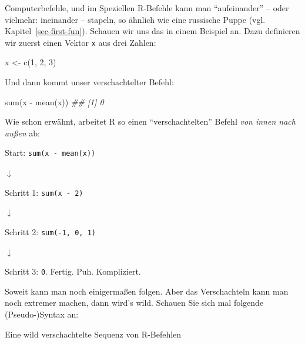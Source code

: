 \documentclass[
  a4paper,
]{scrbook}
\newenvironment{Shaded}{\begin{snugshade}}{\end{snugshade}}
\newcommand{\DecValTok}[1]{\textcolor[rgb]{0.68,0.00,0.00}{#1}}
\newcommand{\DocumentationTok}[1]{\textcolor[rgb]{0.37,0.37,0.37}{\textit{#1}}}
\newcommand{\FunctionTok}[1]{\textcolor[rgb]{0.28,0.35,0.67}{#1}}
\newcommand{\NormalTok}[1]{\textcolor[rgb]{0.00,0.23,0.31}{#1}}
\newcommand{\OtherTok}[1]{\textcolor[rgb]{0.00,0.23,0.31}{#1}}
\newcommand{\SpecialCharTok}[1]{\textcolor[rgb]{0.37,0.37,0.37}{#1}}
\theoremstyle{definition}
\theoremstyle{definition}
\theoremstyle{definition}
\theoremstyle{remark}
\begin{document}
Computerbefehle, und im Speziellen R-Befehle kann man ``aufeinander'' --
oder vielmehr: ineinander -- stapeln, so ähnlich wie eine russische
Puppe (vgl. Kapitel~\ref{sec-first-fun}). Schauen wir uns das in einem
Beispiel an. Dazu definieren wir zuerst einen Vektor \texttt{x} aus drei
Zahlen:

\begin{Shaded}
\begin{Highlighting}[]
\NormalTok{x }\OtherTok{\textless{}{-}} \FunctionTok{c}\NormalTok{(}\DecValTok{1}\NormalTok{, }\DecValTok{2}\NormalTok{, }\DecValTok{3}\NormalTok{)}
\end{Highlighting}
\end{Shaded}

Und dann kommt unser verschachtelter Befehl:

\begin{Shaded}
\begin{Highlighting}[]
\FunctionTok{sum}\NormalTok{(x }\SpecialCharTok{{-}} \FunctionTok{mean}\NormalTok{(x))}
\DocumentationTok{\#\# [1] 0}
\end{Highlighting}
\end{Shaded}

Wie schon erwähnt, arbeitet R so einen ``verschachtelten'' Befehl
\emph{von innen nach außen} ab:

Start: \texttt{sum(x\ -\ mean(x))}

{\(\downarrow\)}

Schritt 1: \texttt{sum(x\ -\ 2)}

{\(\downarrow\)}

Schritt 2: \texttt{sum(-1,\ 0,\ 1)}

{\(\downarrow\)}

Schritt 3: \texttt{0}. Fertig. Puh. Kompliziert.

Soweit kann man noch einigermaßen folgen. Aber das Verschachteln kann
man noch extremer machen, dann wird's wild. Schauen Sie sich mal
folgende (Pseudo-)Syntax an:

\begin{codelisting}

\caption{\label{lst-schachtel}Eine wild verschachtelte Sequenz von
R-Befehlen}

\centering{

\begin{Shaded}
\begin{Highlighting}[]
\FunctionTok{fasse\_zusammen}\NormalTok{(}
  \FunctionTok{gruppiere}\NormalTok{(}
\NormalTok{    wähle}\FunctionTok{\_spalten}\NormalTok{(}
      \FunctionTok{filter\_zeilen}\NormalTok{(meine\_daten))))}
\end{Highlighting}
\end{Shaded}

}

\end{codelisting}%
\end{document}
